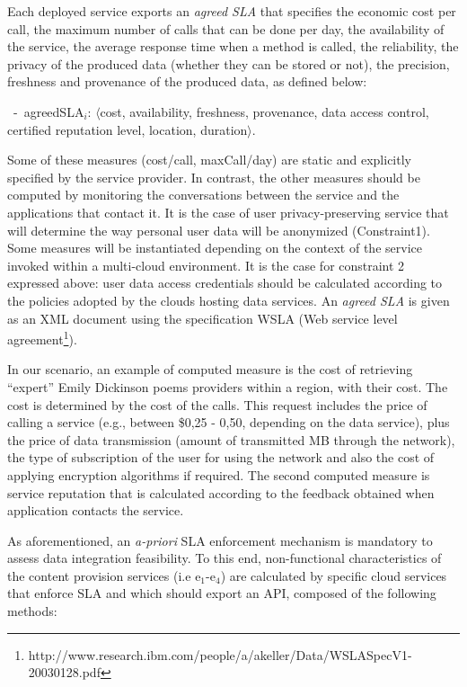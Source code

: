 Each deployed service exports an \textit{agreed SLA} that specifies the economic cost per call, the maximum number of calls that can be done per day, the availability of the service, the average response time when a method is called, the reliability, the privacy of the produced data (whether they can be stored or not), the precision, freshness and provenance of the produced data, as defined below:


\begin{trivlist}\sf\footnotesize
\item[~-~agreedSLA$_i$:] $\langle$cost, availability, freshness, provenance, data access control, certified reputation level, location, duration$\rangle$. 
 \end{trivlist}
 
Some of these measures ({cost/call, maxCall/day}) are static and explicitly specified by the service provider. 
In contrast, the other measures should be computed by monitoring the conversations between the service and the applications that contact it.  It is the case of user privacy-preserving service that will determine the way personal user data will be anonymized (Constraint1).  Some measures will be instantiated depending on the context of  the service invoked within a multi-cloud environment. It is the case for constraint 2 expressed above:   user data access credentials should be calculated according to the policies adopted by the clouds  hosting  data services.
An \textit{agreed SLA} is given as an  XML document using the specification WSLA (Web service level agreement\footnote{\footnotesize http://www.research.ibm.com/people/a/akeller/\-Data/WSLASpecV1-20030128.pdf}).

In our scenario, an example of computed measure is the cost of retrieving ``expert'' Emily Dickinson poems providers within a region, with their cost. 
The cost is determined by the  cost of the calls. 
This request  includes the price of calling a service (e.g.,  between \$0,25 - 0,50, depending on the data service), plus the price of data transmission (amount of transmitted MB through the network), the type of subscription of the user for using the network and also the cost of applying encryption algorithms if required. 
The second computed measure is service reputation that is calculated according to the feedback obtained when application contacts the service.


As aforementioned, an \textit{a-priori} SLA enforcement mechanism is mandatory to assess data integration feasibility.
To this end, non-functional characteristics of the content provision services ({i.e e$_1$-e$_4$}) are calculated by specific cloud services that enforce SLA and which should export  an API, composed of the following methods:

